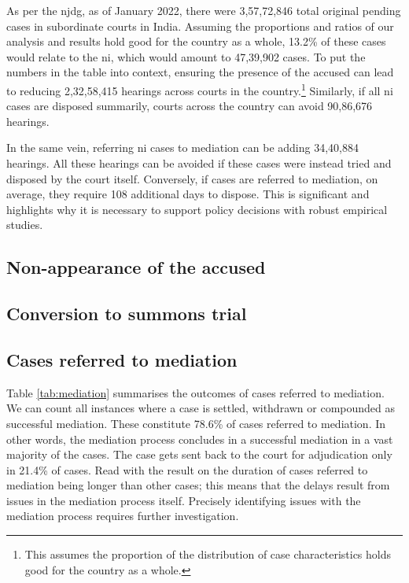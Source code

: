 As per the \gls{njdg}, as of January 2022, there were 3,57,72,846 total original pending cases in subordinate courts in India. Assuming the proportions and ratios of our analysis and results hold good for the country as a whole, 13.2\% of these cases would relate to the \gls{ni}, which would amount to 47,39,902 cases. To put the numbers in the table into context, ensuring the presence of the accused can lead to reducing 2,32,58,415 hearings across courts in the country.\footnote{This assumes the proportion of the distribution of case characteristics holds good for the country as a whole.} Similarly, if all \gls{ni} cases are disposed summarily, courts across the country can avoid 90,86,676 hearings.

In the same vein, referring \gls{ni} cases to mediation can be adding 34,40,884 hearings. All these hearings can be avoided if these cases were instead tried and disposed by the court itself. Conversely, if cases are referred to mediation, on average, they require 108 additional days to dispose. This is significant and highlights why it is necessary to support policy decisions with robust empirical studies.

\subsection{Non-appearance of the accused}
\subsection{Conversion to summons trial}

\subsection{Cases referred to mediation} \label{sec:furth-exam-cases}

Table \ref{tab:mediation} summarises the outcomes of cases referred to mediation. We can count all instances where a case is settled, withdrawn or compounded as successful mediation. These constitute 78.6\% of cases referred to mediation. In other words, the mediation process concludes in a successful mediation in a vast majority of the cases. The case gets sent back to the court for adjudication only in 21.4\% of cases. Read with the result on the duration of cases referred to mediation being longer than other cases; this means that the delays result from issues in the mediation process itself. Precisely identifying issues with the mediation process requires further investigation.

